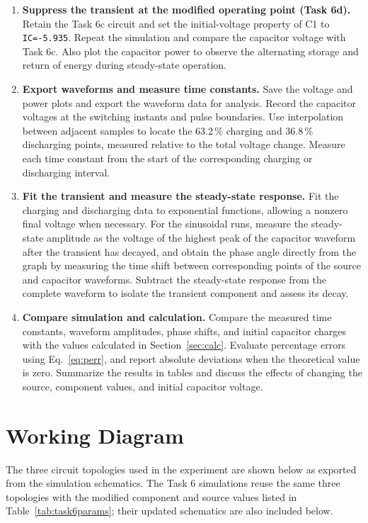 \documentclass[12pt,a4paper]{article}
\begin{document}
\begin{enumerate}[label=\arabic*., leftmargin=2.5em, itemsep=6pt]
		\item \textbf{Suppress the transient at the modified operating
			point (Task 6d).}
		Retain the Task 6c circuit and set the initial-voltage property
		of C1 to \texttt{IC=-5.935}.  Repeat the simulation and
		compare the capacitor voltage with Task 6c.  Also plot the
		capacitor power to observe the alternating storage and return
		of energy during steady-state operation.
		
		\item \textbf{Export waveforms and measure time constants.}
		Save the voltage and power plots and export the waveform data
		for analysis.  Record the capacitor voltages at the switching
		instants and pulse boundaries.  Use interpolation between
		adjacent samples to locate the 63.2\,\% charging and
		36.8\,\% discharging points, measured relative to the total
		voltage change.  Measure each time constant from the start of
		the corresponding charging or discharging interval.
		
		\item \textbf{Fit the transient and measure the steady-state
			response.}
		Fit the charging and discharging data to exponential functions,
		allowing a nonzero final voltage when necessary.  For the
		sinusoidal runs, measure the steady-state amplitude as the
		voltage of the highest peak of the capacitor waveform after the
		transient has decayed, and obtain the phase angle directly from
		the graph by measuring the time shift between corresponding
		points of the source and capacitor waveforms.
		Subtract the steady-state response from the complete waveform
		to isolate the transient component and assess its decay.
		
		\item \textbf{Compare simulation and calculation.}
		Compare the measured time constants, waveform amplitudes,
		phase shifts, and initial capacitor charges with the values
		calculated in Section~\ref{sec:calc}.  Evaluate percentage
		errors using Eq.~\eqref{eq:perr}, and report absolute
		deviations when the theoretical value is zero.  Summarize the
		results in tables and discuss the effects of changing the
		source, component values, and initial capacitor voltage.
	\end{enumerate}
	
	\section{Working Diagram}
	The three circuit topologies used in the experiment are shown below as
	exported from the simulation schematics.  The Task 6 simulations reuse
	the same three topologies with the modified component and source
	values listed in Table~\ref{tab:task6params}; their updated schematics
	are also included below.
	
\end{document}
